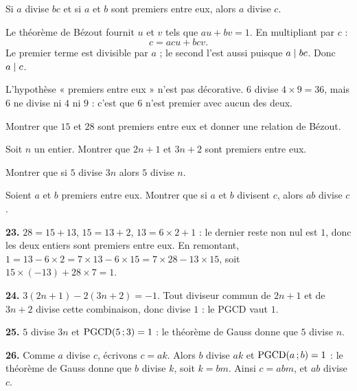 \begin{theoreme}
Si $a$ divise $bc$ et si $a$ et $b$ sont premiers entre eux, alors $a$ divise
$c$.
\end{theoreme}

\begin{demonstration}
Le théorème de Bézout fournit $u$ et $v$ tels que $au+bv = 1$. En multipliant
par $c$ :
\[
  c = acu+bcv .
\]
Le premier terme est divisible par $a$ ; le second l'est aussi puisque
$a \mid bc$. Donc $a \mid c$.
\end{demonstration}

\begin{avertissement}
L'hypothèse « premiers entre eux » n'est pas décorative. $6$ divise
$4\times9 = 36$, mais $6$ ne divise ni $4$ ni $9$ : c'est que $6$ n'est
premier avec aucun des deux.
\end{avertissement}

\begin{entrainement}
\exo[\niveau{1}] Montrer que $15$ et $28$ sont premiers entre eux et donner
une relation de Bézout.

\exo[\niveau{2}] Soit $n$ un entier. Montrer que $2n+1$ et $3n+2$ sont
premiers entre eux.

\exo[\niveau{2}] Montrer que si $5$ divise $3n$ alors $5$ divise $n$.

\exo[\niveau{3}] Soient $a$ et $b$ premiers entre eux. Montrer que si $a$ et
$b$ divisent $c$, alors $ab$ divise $c$.
\end{entrainement}

\begin{corrige}
\textbf{23.} $28 = 15+13$, $15 = 13+2$, $13 = 6\times2+1$ : le dernier reste
non nul est $1$, donc les deux entiers sont premiers entre eux. En remontant,
$1 = 13-6\times2 = 7\times13-6\times15 = 7\times28-13\times15$, soit
$15\times(-13)+28\times7 = 1$.

\textbf{24.} $3(2n+1)-2(3n+2) = -1$. Tout diviseur commun de $2n+1$ et de
$3n+2$ divise cette combinaison, donc divise $1$ : le PGCD vaut $1$.

\textbf{25.} $5$ divise $3n$ et $\operatorname{PGCD}(5\,;3) = 1$ : le théorème de Gauss
donne que $5$ divise $n$.

\textbf{26.} Comme $a$ divise $c$, écrivons $c = ak$. Alors $b$ divise $ak$
et $\operatorname{PGCD}(a\,;b) = 1$ : le théorème de Gauss donne que $b$ divise $k$, soit
$k = bm$. Ainsi $c = abm$, et $ab$ divise $c$.
\end{corrige}

